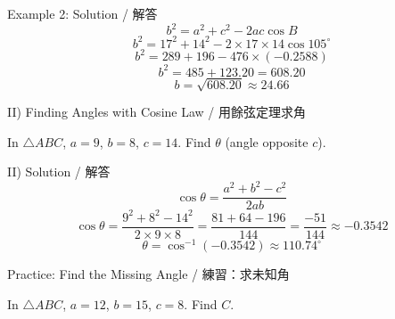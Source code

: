 \documentclass[aspectratio=169]{beamer}
\begin{document}
\begin{frame}{Example 2: Solution / 解答}
    \footnotesize
    \[
        b^2 = a^2 + c^2 - 2ac\cos B
    \]
    \[
        b^2 = 17^2 + 14^2 - 2 \times 17 \times 14 \cos 105^\circ
    \]
    \[
        b^2 = 289 + 196 - 476 \times (-0.2588)
    \]
    \[
        b^2 = 485 + 123.20 = 608.20
    \]
    \[
        b = \sqrt{608.20} \approx 24.66
    \]
\end{frame}


\begin{frame}{II) Finding Angles with Cosine Law / 用餘弦定理求角}
    \begin{tcolorbox}[colback=lightgray,colframe=primary,title=Question]
        In $\triangle ABC$, $a=9$, $b=8$, $c=14$. Find $\theta$ (angle opposite $c$).
    \end{tcolorbox}
    \vspace{0.5em}
    \begin{center}
    \end{center}
\end{frame}

\begin{frame}{II) Solution / 解答}
    \footnotesize
    \[
        \cos \theta = \frac{a^2 + b^2 - c^2}{2ab}
    \]
    \[
        \cos \theta = \frac{9^2 + 8^2 - 14^2}{2 \times 9 \times 8} = \frac{81+64-196}{144} = \frac{-51}{144} \approx -0.3542
    \]
    \[
        \theta = \cos^{-1}(-0.3542) \approx 110.74^\circ
    \]
\end{frame}


\begin{frame}{Practice: Find the Missing Angle / 練習：求未知角}
    \begin{tcolorbox}[colback=lightgray,colframe=accent,title=Practice]
        In $\triangle ABC$, $a=12$, $b=15$, $c=8$. Find $C$.
    \end{tcolorbox}
    \vspace{0.5em}
    \begin{center}
    \end{center}
\end{frame}
\end{document}
